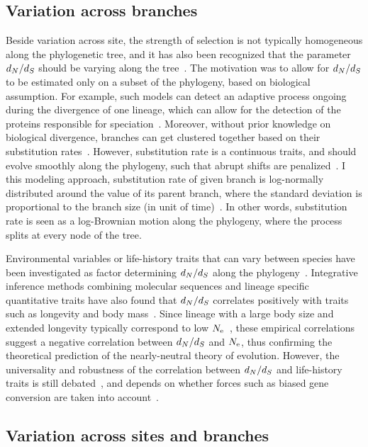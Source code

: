 \subsection{Variation across branches}

Beside variation across site, the strength of selection is not typically homogeneous along the phylogenetic tree, and it has also been recognized that the parameter $d_N / d_S$ should be varying along the tree~\citep{Yang1998}.
The motivation was to allow for $d_N / d_S$ to be estimated only on a subset of the phylogeny, based on biological assumption.
For example, such models can detect an adaptive process ongoing during the divergence of one lineage, which can allow for the detection of the proteins responsible for speciation~\citep{Yang2002, Zhang2004}.
Moreover, without \gls{prior} knowledge on biological divergence, branches can get clustered together based on their \gls{substitution} rates~\citep{Dutheil2012a}.
However, \gls{substitution} rate is a continuous traits, and should evolve smoothly along the phylogeny, such that abrupt shifts are penalized~\citep{Huelsenbeck2003,Seo2004}.
I this modeling approach, \gls{substitution} rate of given branch is log-normally distributed around the value of its parent branch, where the standard deviation is proportional to the branch size (in unit of time)~\citep{Lartillot2011, Brevet2019}.
In other words, \gls{substitution} rate is seen as a log-Brownian motion along the phylogeny, where the process splits at every node of the tree.

Environmental variables or life-history traits that can vary between species have been investigated as factor determining $d_N / d_S$ along the phylogeny~\citep{Felsenstein1985,Romiguier2014}.
Integrative inference methods combining molecular sequences and lineage specific quantitative traits have also found that $d_N / d_S$ correlates positively with traits such as longevity and body mass~\citep{Lartillot2011, Nabholz2013, Figuet2017}.
Since lineage with a large body size and extended longevity typically correspond to low $N_{\textrm{e}}$~\citep{Romiguier2014}, these empirical correlations suggest a negative correlation between $d_N / d_S$ and $N_{\textrm{e}}$, thus confirming the theoretical prediction of the \gls{nearly-neutral} theory of evolution.
However, the universality and robustness of the correlation between $d_N / d_S$ and life-history traits is still debated~\citep{Lanfear2014}, and depends on whether forces such as biased gene conversion are taken into account~\citep{Figuet2016, Bolivar2019}.

\subsection{Variation across sites and branches}

